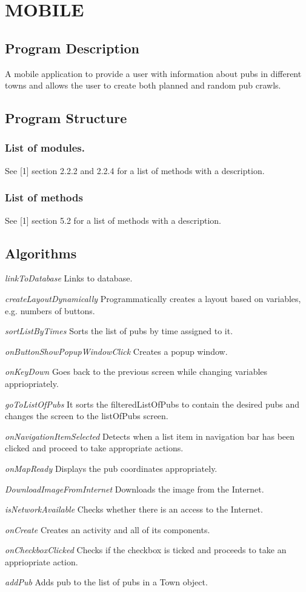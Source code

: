 \documentclass{project}
\begin{document}
\section{MOBILE}
\subsection{Program Description}
A mobile application to provide a user with information about pubs in different towns and allows the user to create both planned and random pub crawls.

\subsection{Program Structure}
\subsubsection{List of modules.}
See [1] section 2.2.2 and 2.2.4 for a list of methods with a description.

\subsubsection{List of methods}
See [1] section 5.2 for a list of methods with a description. 

\subsection{Algorithms}
\textit{linkToDatabase} Links to database.\par
\textit{createLayoutDynamically} Programmatically creates a layout based on variables, e.g. numbers of buttons.\par
\textit{sortListByTimes} Sorts the list of pubs by time assigned to it.\par
\textit{onButtonShowPopupWindowClick} Creates a popup window.\par
\textit{onKeyDown} Goes back to the previous screen while changing variables appriopriately.\par
\textit{goToListOfPubs} It sorts the filteredListOfPubs to contain the desired pubs and changes the screen to the listOfPubs screen.\par
\textit{onNavigationItemSelected} Detects when a list item in navigation bar has been clicked and proceed to take appropriate actions.\par
\textit{onMapReady} Displays the pub coordinates appropriately.\par
\textit{DownloadImageFromInternet} Downloads the image from the Internet.\par
\textit{isNetworkAvailable} Checks whether there is an access to the Internet.\par
\textit{onCreate} Creates an activity and all of its components.\par
\textit{onCheckboxClicked} Checks if the checkbox is ticked and proceeds to take an appriopriate action.\par
\textit{addPub} Adds pub to the list of pubs in a Town object.
\end{document}

